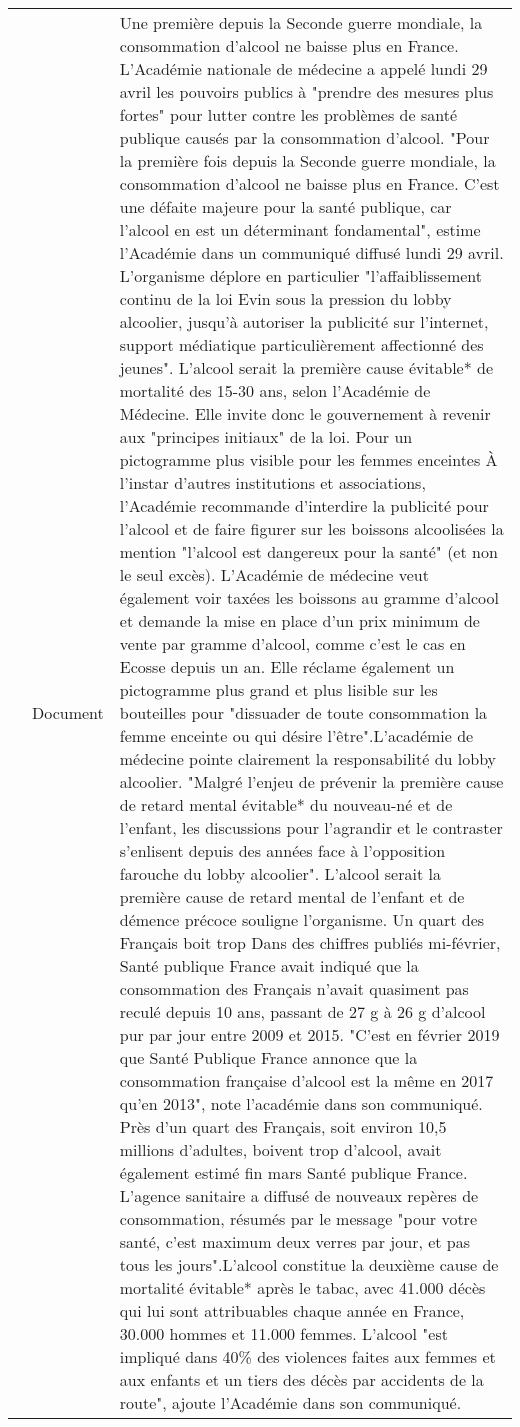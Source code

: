 \documentclass[11pt,a4paper]{article}
\begin{document}
 
\begin{table*} 
 \centering 
 \begin{tabular}{|cr|L|} 
 \hline 
 & Document &\baselineskip=7pt {\scriptsize Une première depuis la Seconde guerre mondiale, la consommation d'alcool ne baisse plus en France. L'Académie nationale de médecine a appelé lundi 29 avril les pouvoirs publics à "prendre des mesures plus fortes" pour lutter contre les problèmes de santé publique causés par la consommation d'alcool. "Pour la première fois depuis la Seconde guerre mondiale, la consommation d'alcool ne baisse plus en France. C'est une défaite majeure pour la santé publique, car l'alcool en est un déterminant fondamental", estime l'Académie dans un communiqué diffusé lundi 29 avril. L'organisme déplore en particulier "l'affaiblissement continu de la loi Evin sous la pression du lobby alcoolier, jusqu'à autoriser la publicité sur l'internet, support médiatique particulièrement affectionné des jeunes". L'alcool serait la première cause évitable* de mortalité des 15-30 ans, selon l'Académie de Médecine. Elle invite donc le gouvernement à revenir aux "principes initiaux" de la loi. Pour un pictogramme plus visible pour les femmes enceintes À l'instar d'autres institutions et associations, l'Académie recommande d'interdire la publicité pour l'alcool et de faire figurer sur les boissons alcoolisées la mention "l'alcool est dangereux pour la santé" (et non le seul excès). L'Académie de médecine veut également voir taxées les boissons au gramme d'alcool et demande la mise en place d'un prix minimum de vente par gramme d'alcool, comme c'est le cas en Ecosse depuis un an. Elle réclame également un pictogramme plus grand et plus lisible sur les bouteilles pour "dissuader de toute consommation la femme enceinte ou qui désire l'être".L'académie de médecine pointe clairement la responsabilité du lobby alcoolier. "Malgré l'enjeu de prévenir la première cause de retard mental évitable* du nouveau-né et de l'enfant, les discussions pour l'agrandir et le contraster s'enlisent depuis des années face à l'opposition farouche du lobby alcoolier". L'alcool serait la première cause de retard mental de l'enfant et de démence précoce souligne l'organisme. Un quart des Français boit trop Dans des chiffres publiés mi-février, Santé publique France avait indiqué que la consommation des Français n'avait quasiment pas reculé depuis 10 ans, passant de 27 g à 26 g d'alcool pur par jour entre 2009 et 2015. "C'est en février 2019 que Santé Publique France annonce que la consommation française d'alcool est la même en 2017 qu'en 2013", note l'académie dans son communiqué. Près d'un quart des Français, soit environ 10,5 millions d'adultes, boivent trop d'alcool, avait également estimé fin mars Santé publique France. L'agence sanitaire a diffusé de nouveaux repères de consommation, résumés par le message "pour votre santé, c'est maximum deux verres par jour, et pas tous les jours".L'alcool constitue la deuxième cause de mortalité évitable* après le tabac, avec 41.000 décès qui lui sont attribuables chaque année en France, 30.000 hommes et 11.000 femmes. L'alcool "est impliqué dans 40\% des violences faites aux femmes et aux enfants et un tiers des décès par accidents de la route", ajoute l'Académie dans son communiqué.} \\ 

\end{tabular}
\end{table*}
\end{document}
